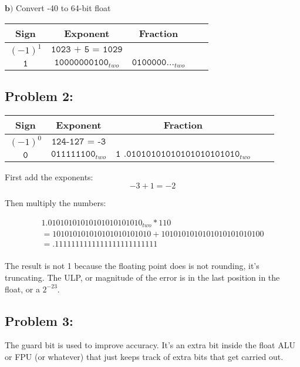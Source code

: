 \documentclass[a4paper]{article}
\begin{document}
$\textbf{b)}$ Convert -40 to 64-bit float

\begin{center}
\begin{tabular}{|c|c|c|c|c|}
\hline
Sign & Exponent & Fraction\\
\hline
$(-1)^1$ & $\texttt{1023 + 5 = 1029}$ & $\texttt{}$ \\
\hline
$\texttt{1}$ & $\texttt{10000000100}_{two}$ & $\texttt{0100000...}_{two}$ \\
\hline
\end{tabular}
\end{center}

\subsection*{Problem 2:}

\begin{center}
\begin{tabular}{|c|c|c|c|c|}
\hline
Sign & Exponent & Fraction\\
\hline
$(-1)^0$ & $\texttt{124-127 = -3}$ & $\texttt{}$ \\
\hline
$\texttt{0}$ & $\texttt{011111100}_{two}$ & $\texttt{1 .01010101010101010101010}_{two}$ \\
\hline
\end{tabular}
\end{center}

First add the exponents:
\begin{equation}
-3 + 1 = -2
\end{equation}

Then multiply the numbers:

\begin{align}
1.01010101010101010101010_{two} * 110 \\
= 101010101010101010101010 + 1010101010101010101010100 \\
= .1111111111111111111111111 \\
\end{align}

The result is not 1 because the floating point does is not rounding, it's truncating. The ULP, or magnitude of the error is in the last position in the float, or a $2^{-23}$.

\subsection*{Problem 3:}

The guard bit is used to improve accuracy. It's an extra bit inside the float ALU or FPU (or whatever) that just keeps track of extra bits that get carried out.
\end{document}
